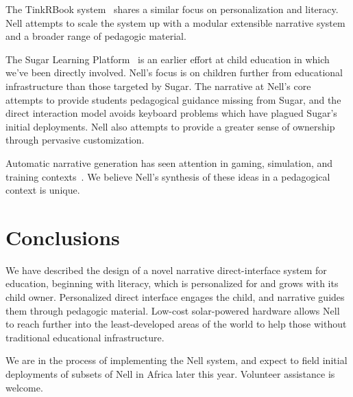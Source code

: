 \documentclass{sig-alternate}
\begin{document}
The TinkRBook system~\cite{chang:tinkrbook} shares a similar focus on
personalization and literacy.  Nell attempts to scale the system up
with a modular extensible narrative system and a broader range
of pedagogic material.

The Sugar Learning Platform~\cite{sugar} is an earlier effort at
child education in which we've been directly involved.  Nell's focus is
on children further from educational infrastructure than those
targeted by Sugar.
The narrative at Nell's core attempts to provide students
pedagogical guidance missing from Sugar,
and the direct interaction model avoids keyboard
problems which have plagued Sugar's initial deployments.  Nell also
attempts to provide a greater sense of ownership through pervasive
customization.



Automatic narrative generation has seen attention in
gaming, simulation, and training contexts~\cite{riedl:2008}.
We believe
Nell's synthesis of these ideas in a pedagogical context is unique.

\section{Conclusions}
We have described the design of a novel narrative direct-interface
system for education, beginning with literacy, which is personalized for and grows with
its child owner.  Personalized direct interface engages the child, and
narrative guides them through pedagogic material.  Low-cost
solar-powered hardware allows Nell to reach further into the
least-developed areas of the world to help those without traditional
educational infrastructure.

We are in the process of implementing the Nell system, and expect to
field initial deployments of subsets of Nell in Africa later this year.
Volunteer assistance is welcome.

\end{document}

